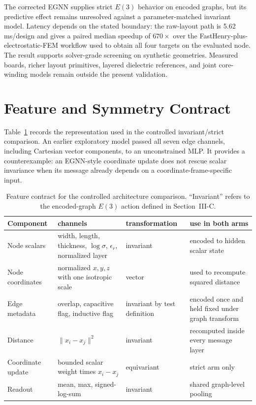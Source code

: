 \documentclass[letterpaper,twocolumn,9pt]{extarticle}
\begin{document}
The corrected EGNN supplies strict $E(3)$ behavior on encoded graphs, but its predictive effect remains unresolved against a parameter-matched invariant model. Latency depends on the stated boundary: the raw-layout path is 5.62\,ms/design and gives a paired median speedup of $670\times$ over the FastHenry-plus-electrostatic-FEM workflow used to obtain all four targets on the evaluated node. The result supports solver-grade screening on synthetic geometries. Measured boards, richer layout primitives, layered dielectric references, and joint core-winding models remain outside the present validation.

\appendix
\section{Feature and Symmetry Contract}
Table~\ref{tab:features} records the representation used in the controlled invariant/strict comparison. An earlier exploratory model passed all seven edge channels, including Cartesian vector components, to an unconstrained MLP. It provides a counterexample: an EGNN-style coordinate update does not rescue scalar invariance when its message already depends on a coordinate-frame-specific input.

\begin{table}[t]
\caption{Feature contract for the controlled architecture comparison. ``Invariant'' refers to the encoded-graph $E(3)$ action defined in Section~III-C.}
\label{tab:features}
\centering
\small
\begin{tabular}{p{}p{}p{}p{}}
\toprule
Component & channels & transformation & use in both arms\\
\midrule
Node scalars & width, length, thickness, $\log\sigma$, $\epsilon_r$, normalized layer & invariant & encoded to hidden scalar state\\
Node coordinates & normalized $x,y,z$ with one isotropic scale & vector & used to recompute squared distance\\
Edge metadata & overlap, capacitive flag, inductive flag & invariant by test definition & encoded once and held fixed under graph transform\\
Distance & $\|x_i-x_j\|^2$ & invariant & recomputed inside every message layer\\
Coordinate update & bounded scalar weight times $x_i-x_j$ & equivariant & strict arm only\\
Readout & mean, max, signed-log-sum & invariant & shared graph-level pooling\\
\bottomrule
\end{tabular}
\end{table}
\end{document}
